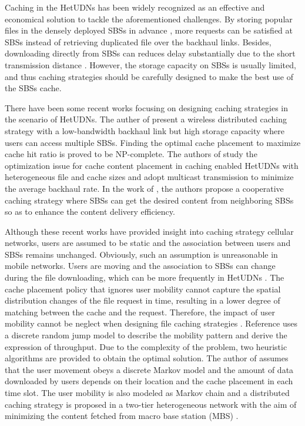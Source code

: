 \documentclass[conference]{IEEEtran}
\begin{document}
Caching in the HetUDNs has been widely recognized as an effective and economical solution to tackle the aforementioned challenges. By storing popular files in the densely deployed SBSs in advance \cite{8269405}, more requests can be satisfied at SBSs instead of retrieving duplicated file over the backhaul links. Besides, downloading directly from SBSs can reduces delay substantially due to the short transmission distance \cite{6736753}. However, the storage capacity on SBSs is usually limited, and thus caching strategies should be carefully designed to make the best use of the SBSs cache.

There have been some recent works focusing on designing caching strategies in the scenario of HetUDNs. The auther of \cite{6600983} present a wireless distributed caching strategy with a low-bandwidth backhaul link but high storage capacity where users can access multiple SBSs. Finding the optimal cache placement to maximize cache hit ratio is proved to be NP-complete. The authors of \cite{6952688} study the optimization issue for cache content placement in caching enabled HetUDNs with heterogeneous file and cache sizes and adopt multicast transmission to minimize the average backhaul rate. In the work of \cite{8116421}, the authors propose a cooperative caching strategy where SBSs can get the desired content from neighboring SBSs so as to enhance the content delivery efficiency.

Although these recent works have provided insight into caching strategy cellular networks, users are assumed to be static and the association between users and SBSs remains unchanged. Obviously, such an assumption is unreasonable in mobile networks. Users are moving and the association to SBSs can change during the file downloading, which can be more frequently in HetUDNs \cite{7268835}. The cache placement policy that ignores user mobility cannot capture the spatial distribution changes of the file request in time, resulting in a lower degree of matching between the cache and the request. Therefore, the impact of user mobility cannot be neglect when designing file caching strategies \cite{7537180}. Reference \cite{8013789} uses a discrete random jump model to describe the mobility pattern and derive the expression of throughput. Due to the complexity of the problem, two heuristic algorithms are provided to obtain the optimal solution. The author of \cite{6620380} assumes that the user movement obeys a discrete Markov model and the amount of data downloaded by users depends on their location and the cache placement in each time slot. The user mobility is also modeled as Markov chain and a distributed caching strategy is proposed in a two-tier heterogeneous network with the aim of minimizing the content fetched from macro base station (MBS) \cite{7484297}.
\end{document}
